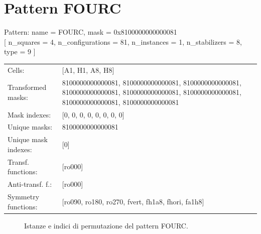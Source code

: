 \newpage

\section{Pattern FOURC}

\begin{tcolorbox}[sharp corners, fontupper=\ttfamily\small, colback=white]
  \noindent Pattern: name = FOURC, mask = 0x8100000000000081\\
  {[} n\_squares = 4, n\_configurations = 81,
  n\_instances = 1, n\_stabilizers = 8, type = 9 { ]}\\[1.0ex]
  \begin{tabularx}{\textwidth}{@{} p{3.5cm} X @{}}
    Cells:               & {[}A1, H1, A8, H8{]}\\[0.5ex]
    Transformed masks:   & 8100000000000081, 8100000000000081, 8100000000000081, 8100000000000081, 8100000000000081, 8100000000000081, 8100000000000081, 8100000000000081\\[0.5ex]
    Mask indexes:        & {[}0, 0, 0, 0, 0, 0, 0, 0{]}\\[0.5ex]
    Unique masks:        & 8100000000000081\\[0.5ex]
    Unique mask indexes: & {[}0{]}\\[0.5ex]
    Transf. functions:   & {[}ro000{]}\\[0.5ex]
    Anti-transf. f.:     & {[}ro000{]}\\[0.5ex]
    Symmetry functions:  & {[}ro090, ro180, ro270, fvert, fh1a8, fhori, fa1h8{]}\\[0.5ex]
  \end{tabularx}
\end{tcolorbox}

\begin{figure}[htbp]
  \centering
   \hfill
   \hfill
   \hfill
  \vspace{0.3cm}
   \hfill
   \hfill
   \hfill
  \caption{Istanze e indici di permutazione del pattern FOURC.}
\end{figure}

\newpage

